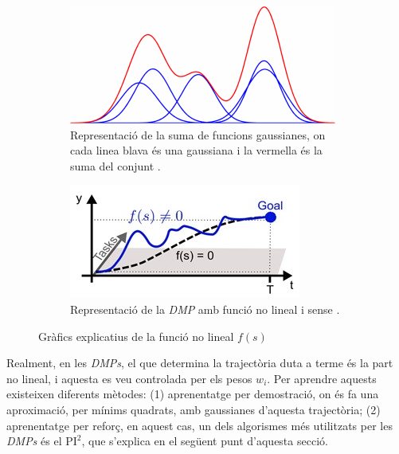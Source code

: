 \documentclass[12pt,a4paper,final,twoside]{report}
\begin{document}
\begin{figure}[tb]
\centering
\begin{subfigure}[b]{0.48\textwidth}
\includegraphics[width=\textwidth]{Imatges/gaussians-sum.png}
\caption{Representació de la suma de funcions gaussianes, on cada linea blava és una gaussiana i la vermella és la suma del conjunt \cite{Ruckert2012}.}
\label{fig:gaussians-sum}
\end{subfigure}
\begin{subfigure}[b]{0.48\textwidth}
\includegraphics[width=\textwidth]{Imatges/DMP-with-gaussians.jpg}
\caption{Representació de la \textit{DMP} amb funció no lineal i sense \cite{Ruckert2013}.}
\label{fig:DMP-with-gaussians}
\end{subfigure}
\caption{Gràfics explicatius de la funció no lineal $f(s)$}
\end{figure}

Realment, en les \textit{DMPs}, el que determina la trajectòria duta a terme és la part no lineal, i aquesta es veu controlada per els pesos $w_i$. Per aprendre aquests existeixen diferents mètodes: (1) aprenentatge per demostració, on és fa una aproximació, per mínims quadrats, amb gaussianes d'aquesta trajectòria; (2) aprenentatge per reforç, en aquest cas, un dels algorismes més utilitzats per les \textit{DMPs} és el $\mathrm{PI^2}$, que s'explica en el següent punt d'aquesta secció.
\end{document}
